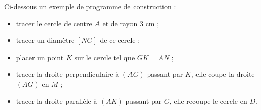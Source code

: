Ci-dessous un exemple de programme de construction :
\begin{itemize}
   \item tracer le cercle de centre $A$ et de rayon 3 cm ;
   \item tracer un diamètre $[NG]$ de ce cercle ;
   \item placer un point $K$ sur le cercle tel que $GK = AN$ ;
   \item tracer la droite perpendiculaire à $(AG)$ passant par $K$, elle coupe la droite $(AG)$ en $M$ ;
   \item tracer la droite parallèle à $(AK)$ passant par $G$, elle recoupe le cercle en $D$.
\end{itemize}

